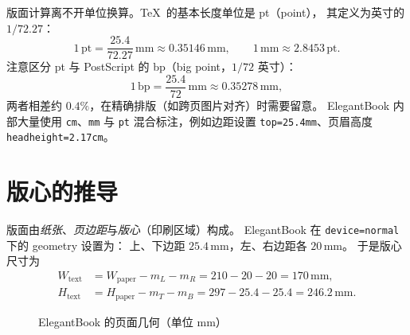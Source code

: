 版面计算离不开单位换算。\TeX\ 的基本长度单位是 pt（point），
其定义为英寸的 $1/72.27$：
\begin{equation}
  1\,\mathrm{pt} = \frac{25.4}{72.27}\,\mathrm{mm}
  \approx 0.35146\,\mathrm{mm},
  \qquad
  1\,\mathrm{mm} \approx 2.8453\,\mathrm{pt}.
\end{equation}
注意区分 pt 与 PostScript 的 bp（big point，$1/72$ 英寸）：
\begin{equation}
  1\,\mathrm{bp} = \frac{25.4}{72}\,\mathrm{mm} \approx 0.35278\,\mathrm{mm},
\end{equation}
两者相差约 $0.4\%$，在精确排版（如跨页图片对齐）时需要留意。
ElegantBook 内部大量使用 \texttt{cm}、\texttt{mm} 与 \texttt{pt}
混合标注，例如边距设置 \texttt{top=25.4mm}、页眉高度
\texttt{headheight=2.17cm}。

\section{版心的推导}

版面由\emph{纸张}、\emph{页边距}与\emph{版心}（印刷区域）构成。
ElegantBook 在 \texttt{device=normal} 下的 geometry 设置为：
上、下边距 $25.4\,\mathrm{mm}$，左、右边距各 $20\,\mathrm{mm}$。
于是版心尺寸为
\begin{align}
  W_{\mathrm{text}} &= W_{\mathrm{paper}} - m_L - m_R
                      = 210 - 20 - 20 = 170\,\mathrm{mm},\\
  H_{\mathrm{text}} &= H_{\mathrm{paper}} - m_T - m_B
                      = 297 - 25.4 - 25.4 = 246.2\,\mathrm{mm}.
  \label{eq:textbox}
\end{align}

\begin{figure}[htbp]
  \centering
  \caption{ElegantBook 的页面几何（单位 mm）}\label{fig:pagegeo}
\end{figure}

